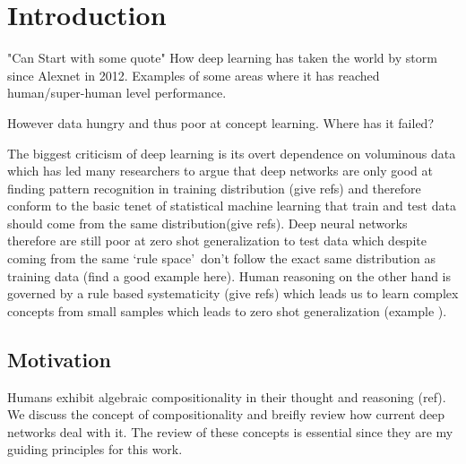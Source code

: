 \chapter{Introduction}
	
"Can Start with some quote"
How deep learning has taken the world by storm since Alexnet in 2012. Examples of some areas where it has reached human/super-human level performance.

However data hungry and thus poor at concept learning. Where has it failed?

The biggest criticism of deep learning is its overt dependence on voluminous data which has led many researchers to argue that deep networks are only good at finding pattern recognition in training distribution (give refs) and therefore conform to the basic tenet of statistical machine learning that train and test data should come from the same distribution(give refs). Deep neural networks therefore are still poor at zero shot generalization to test data which despite coming from the same \lq rule space{}\rq\ don't follow the exact same distribution as training data (find a good example here). Human reasoning on the other hand is governed by a rule based systematicity (give refs) which leads us to learn complex concepts from small samples which leads to zero shot generalization (example ).


\section{Motivation} \label{Chapter:motivation}
Humans exhibit algebraic compositionality in their thought and reasoning (ref). We discuss the concept of compositionality and breifly review how current deep networks deal with it. The review of these concepts is essential since they are my guiding principles for this work.

